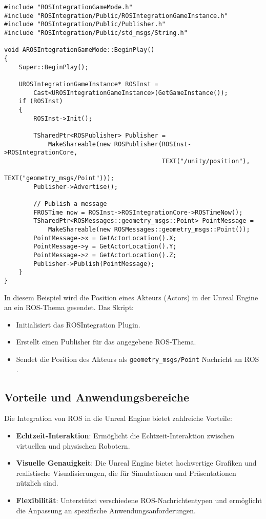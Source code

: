 \begin{verbatim}
#include "ROSIntegrationGameMode.h"
#include "ROSIntegration/Public/ROSIntegrationGameInstance.h"
#include "ROSIntegration/Public/Publisher.h"
#include "ROSIntegration/Public/std_msgs/String.h"

void AROSIntegrationGameMode::BeginPlay()
{
    Super::BeginPlay();

    UROSIntegrationGameInstance* ROSInst = 
        Cast<UROSIntegrationGameInstance>(GetGameInstance());
    if (ROSInst)
    {
        ROSInst->Init();

        TSharedPtr<ROSPublisher> Publisher = 
            MakeShareable(new ROSPublisher(ROSInst->ROSIntegrationCore, 
                                           TEXT("/unity/position"), 
                                           TEXT("geometry_msgs/Point")));
        Publisher->Advertise();
        
        // Publish a message
        FROSTime now = ROSInst->ROSIntegrationCore->ROSTimeNow();
        TSharedPtr<ROSMessages::geometry_msgs::Point> PointMessage = 
            MakeShareable(new ROSMessages::geometry_msgs::Point());
        PointMessage->x = GetActorLocation().X;
        PointMessage->y = GetActorLocation().Y;
        PointMessage->z = GetActorLocation().Z;
        Publisher->Publish(PointMessage);
    }
}
\end{verbatim}

In diesem Beispiel wird die Position eines Akteurs (Actors) in der Unreal Engine an ein ROS-Thema gesendet. Das Skript:

\begin{itemize}
    \item Initialisiert das ROSIntegration Plugin.
    \item Erstellt einen Publisher für das angegebene ROS-Thema.
    \item Sendet die Position des Akteurs als \texttt{geometry\_msgs/Point} Nachricht an ROS \cite{ros_integration_github}.
\end{itemize}

\subsection{Vorteile und Anwendungsbereiche}

Die Integration von ROS in die Unreal Engine bietet zahlreiche Vorteile:

\begin{itemize}
    \item \textbf{Echtzeit-Interaktion}: Ermöglicht die Echtzeit-Interaktion zwischen virtuellen und physischen Robotern.
    \item \textbf{Visuelle Genauigkeit}: Die Unreal Engine bietet hochwertige Grafiken und realistische Visualisierungen, die für Simulationen und Präsentationen nützlich sind.
    \item \textbf{Flexibilität}: Unterstützt verschiedene ROS-Nachrichtentypen und ermöglicht die Anpassung an spezifische Anwendungsanforderungen.
\end{itemize}

